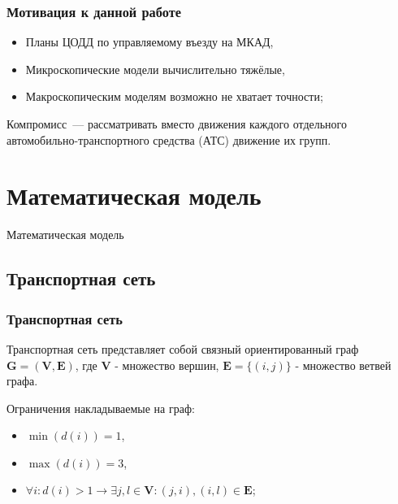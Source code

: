 \begin{frame}
    \frametitle{Мотивация к данной работе}
    \begin{itemize}
        \item Планы ЦОДД по управляемому въезду на МКАД,
        \item Микроскопические модели вычислительно тяжёлые,
        \item Макроскопическим моделям возможно не хватает точности;
    \end{itemize}

    Компромисс~--- рассматривать вместо движения каждого отдельного автомобильно-транспортного средства (АТС) движение их групп.
\end{frame}

\section{Математическая модель}
\begin{frame}
    \begin{center}
        \Huge
        Математическая модель
    \end{center}
\end{frame}

\subsection{Транспортная сеть}
\begin{frame}
    \frametitle{Транспортная сеть}

    Транспортная сеть представляет собой связный ориентированный граф \(\mathbf{G} = (\mathbf{V}, \mathbf{E})\), где \(\mathbf{V}\) - множество вершин, \(\mathbf{E} = \{(i, j)\}\) - множество ветвей графа.

    Ограничения накладываемые на граф:
    \begin{itemize}
        \item \(\min(d(i)) = 1\),
        \item \(\max(d(i)) = 3\),
        \item \(\forall i: d(i) > 1 \rightarrow \exists j, l \in \mathbf{V} : (j, i), (i, l) \in \mathbf{E}\);
    \end{itemize}
\end{frame}

